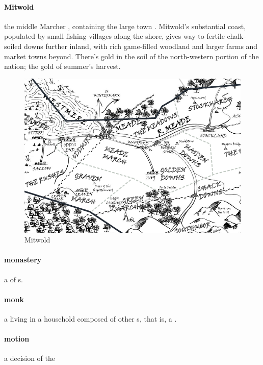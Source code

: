 \paragraph{Mitwold} the middle Marcher , containing the large town . Mitwold's substantial  coast, populated by small fishing villages along the shore, gives way to fertile chalk-soiled downs further inland, with rich game-filled woodland and larger farms and market towns beyond. There's gold in the soil of the north-western portion of the nation; the gold of summer's harvest.\begin{figure}\centering\includegraphics[width=16.3cm,angle=90]{atlasofthemarches/Mitwold}\caption{Mitwold}\end{figure}
\paragraph{monastery} a  of s.
\paragraph{monk} a  living in a household composed of other s, that is, a .
\paragraph{motion} a decision of the 

